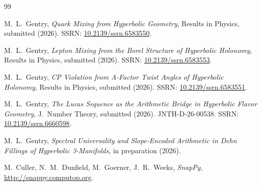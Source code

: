 \documentclass[12pt]{article}
\begin{document}
\begin{thebibliography}{99}

M.~L.~Gentry,
\textit{Quark Mixing from Hyperbolic Geometry},
Results in Physics, submitted (2026).
SSRN: \href{https://doi.org/10.2139/ssrn.6583550}{10.2139/ssrn.6583550}.

M.~L.~Gentry,
\textit{Lepton Mixing from the Borel Structure of Hyperbolic Holonomy},
Results in Physics, submitted (2026).
SSRN: \href{https://doi.org/10.2139/ssrn.6583553}{10.2139/ssrn.6583553}.

M.~L.~Gentry,
\textit{CP Violation from A-Factor Twist Angles of Hyperbolic Holonomy},
Results in Physics, submitted (2026).
SSRN: \href{https://doi.org/10.2139/ssrn.6583551}{10.2139/ssrn.6583551}.

M.~L.~Gentry,
\textit{The Lucas Sequence as the Arithmetic Bridge in Hyperbolic
Flavor Geometry},
J.\ Number Theory, submitted (2026). JNTH-D-26-00538.
SSRN: \href{https://doi.org/10.2139/ssrn.6660598}{10.2139/ssrn.6660598}.

M.~L.~Gentry,
\textit{Spectral Universality and Slope-Encoded Arithmetic in Dehn
Fillings of Hyperbolic 3-Manifolds},
in preparation (2026).

M.~Culler, N.~M.~Dunfield, M.~Goerner, J.~R.~Weeks,
\textit{SnapPy},
\url{http://snappy.computop.org}.

\end{thebibliography}
\end{document}
